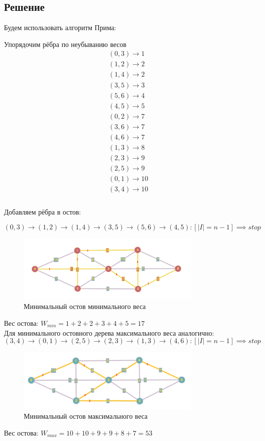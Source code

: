 \documentclass[a4paper,14pt]{extreport}
\begin{document}
\subsection{Решение}
Будем использовать алгоритм Прима:\par
Упорядочим рёбра по неубыванию весов
\begin{equation*}
\begin{multlined}
    (0,3) \to 1\\
    (1,2) \to 2\\
    (1,4) \to 2\\
    (3,5) \to 3\\
    (5,6) \to 4\\
    (4,5) \to 5\\
    (0,2) \to 7\\
    (3,6) \to 7\\
    (4,6) \to 7\\
    (1,3) \to 8\\
    (2,3) \to 9\\
    (2,5) \to 9\\
    (0,1) \to 10\\
    (3,4) \to 10\\
\end{multlined}
\end{equation*}\\

Добавляем рёбра в остов:\par
\begin{equation*}
    (0,3) \to (1,2) \to (1,4) \to (3,5) \to (5,6) \to (4,5): [|I| = n-1] \implies stop
\end{equation*}

\begin{figure}[h]
    \centering
    \includegraphics[width=0.8\textwidth]{graph2.png}
    \caption{Минимальный остов минимального веса}
\end{figure}

Вес остова: $W_{min} = 1+2+2+3+4+5=17$ \\

Для минимального остовного дерева максимального веса аналогично:
\begin{equation*}
    (3,4) \to (0,1) \to (2,5) \to (2,3) \to (1,3) \to (4,6): [|I| = n-1] \implies stop
\end{equation*}

\begin{figure}[h]
    \centering
    \includegraphics[width=0.8\textwidth]{graph3.png}
    \caption{Минимальный остов максимального веса}
\end{figure}

Вес остова: $W_{max} = 10+10+9+9+8+7=53$ \\
\end{document}

